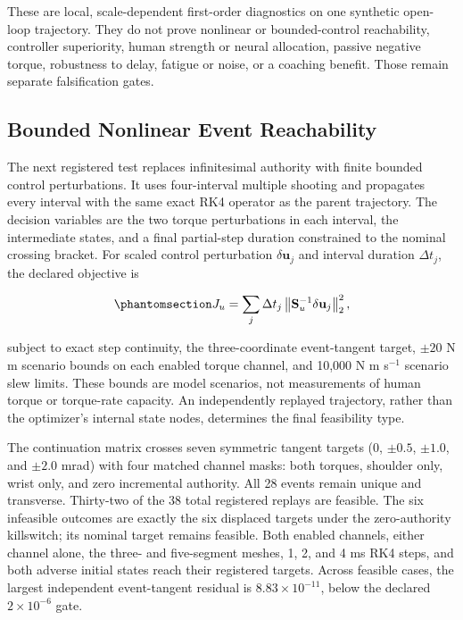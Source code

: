 \documentclass[
  letterpaper,
]{report}
\begin{document}
These are local, scale-dependent first-order diagnostics on one
synthetic open-loop trajectory. They do not prove nonlinear or
bounded-control reachability, controller superiority, human strength or
neural allocation, passive negative torque, robustness to delay, fatigue
or noise, or a coaching benefit. Those remain separate falsification
gates.

\subsection{Bounded Nonlinear Event
Reachability}\label{sec-ladder-bounded-event-reachability}

The next registered test replaces infinitesimal authority with finite
bounded control perturbations. It uses four-interval multiple shooting
and propagates every interval with the same exact RK4 operator as the
parent trajectory. The decision variables are the two torque
perturbations in each interval, the intermediate states, and a final
partial-step duration constrained to the nominal crossing bracket. For
scaled control perturbation \(\delta\mathbf u_j\) and interval duration
\(\Delta t_j\), the declared objective is

\begin{equation}\phantomsection\label{eq-ladder-bounded-event-objective}{
J_u=\sum_j \Delta t_j
\left\|\mathbf S_u^{-1}\delta\mathbf u_j\right\|_2^2,
}\end{equation}

subject to exact step continuity, the three-coordinate event-tangent
target, \(\pm20\) N m scenario bounds on each enabled torque channel,
and 10,000 N m s\(^{-1}\) scenario slew limits. These bounds are model
scenarios, not measurements of human torque or torque-rate capacity. An
independently replayed trajectory, rather than the optimizer's internal
state nodes, determines the final feasibility type.

The continuation matrix crosses seven symmetric tangent targets (\(0\),
\(\pm0.5\), \(\pm1.0\), and \(\pm2.0\) mrad) with four matched channel
masks: both torques, shoulder only, wrist only, and zero incremental
authority. All 28 events remain unique and transverse. Thirty-two of the
38 total registered replays are feasible. The six infeasible outcomes
are exactly the six displaced targets under the zero-authority
killswitch; its nominal target remains feasible. Both enabled channels,
either channel alone, the three- and five-segment meshes, 1, 2, and 4 ms
RK4 steps, and both adverse initial states reach their registered
targets. Across feasible cases, the largest independent event-tangent
residual is \(8.83\times10^{-11}\), below the declared
\(2\times10^{-6}\) gate.
\end{document}
